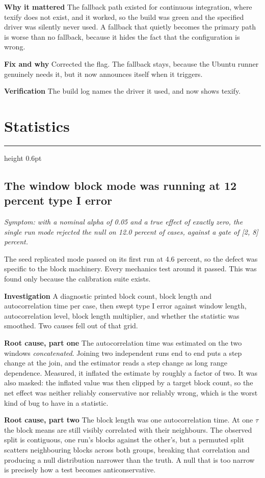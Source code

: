 \documentclass[11pt,a4paper]{article}
\newcommand{\entry}[2]{%
  \vspace{0.6em}%
  {\color{rulegrey}\hrule height 0.6pt}%
  \vspace{0.5em}%
  \subsection*{#1}%
  \textit{\small #2}\par\vspace{0.3em}%
}
\newcommand{\field}[1]{\vspace{0.35em}\textbf{#1}\quad}
\begin{document}
\field{Why it mattered} The fallback path existed for continuous integration,
where texify does not exist, and it worked, so the build was green and the
specified driver was silently never used. A fallback that quietly becomes the
primary path is worse than no fallback, because it hides the fact that the
configuration is wrong.

\field{Fix and why} Corrected the flag. The fallback stays, because the Ubuntu
runner genuinely needs it, but it now announces itself when it triggers.

\field{Verification} The build log names the driver it used, and now shows
texify.

\section{Statistics}

\entry{The window block mode was running at 12 percent type I error}{Symptom:
with a nominal alpha of 0.05 and a true effect of exactly zero, the single run
mode rejected the null on 12.0 percent of cases, against a gate of [2, 8]
percent.}

The seed replicated mode passed on its first run at 4.6 percent, so the defect
was specific to the block machinery. Every mechanics test around it passed. This
was found only because the calibration suite exists.

\field{Investigation} A diagnostic printed block count, block length and
autocorrelation time per case, then swept type I error against window length,
autocorrelation level, block length multiplier, and whether the statistic was
smoothed. Two causes fell out of that grid.

\field{Root cause, part one} The autocorrelation time was estimated on the two
windows \emph{concatenated}. Joining two independent runs end to end puts a step
change at the join, and the estimator reads a step change as long range
dependence. Measured, it inflated the estimate by roughly a factor of two. It was
also masked: the inflated value was then clipped by a target block count, so the
net effect was neither reliably conservative nor reliably wrong, which is the
worst kind of bug to have in a statistic.

\field{Root cause, part two} The block length was one autocorrelation time. At
one $\tau$ the block means are still visibly correlated with their neighbours.
The observed split is contiguous, one run's blocks against the other's, but a
permuted split scatters neighbouring blocks across both groups, breaking that
correlation and producing a null distribution narrower than the truth. A null
that is too narrow is precisely how a test becomes anticonservative.
\end{document}
